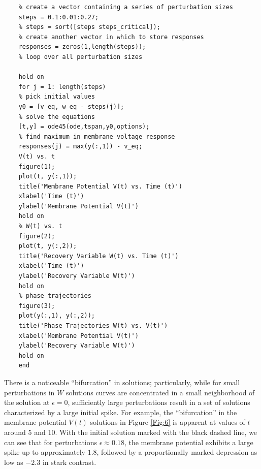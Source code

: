 \documentclass{book}
\theoremstyle{definition}
\begin{document}
\begin{framed}
	\begin{verbatim}
	% create a vector containing a series of perturbation sizes
	steps = 0.1:0.01:0.27;
	% steps = sort([steps steps_critical]);
	% create another vector in which to store responses
	responses = zeros(1,length(steps));
	% loop over all perturbation sizes
	
	hold on
	for j = 1: length(steps)
	% pick initial values
	y0 = [v_eq, w_eq - steps(j)];
	% solve the equations
	[t,y] = ode45(ode,tspan,y0,options);
	% find maximum in membrane voltage response
	responses(j) = max(y(:,1)) - v_eq;
	V(t) vs. t
	figure(1);
	plot(t, y(:,1));
	title('Membrane Potential V(t) vs. Time (t)')
	xlabel('Time (t)') 
	ylabel('Membrane Potential V(t)') 
	hold on
	% W(t) vs. t
	figure(2);
	plot(t, y(:,2));
	title('Recovery Variable W(t) vs. Time (t)')
	xlabel('Time (t)') 
	ylabel('Recovery Variable W(t)') 
	hold on
	% phase trajectories
	figure(3);
	plot(y(:,1), y(:,2));
	title('Phase Trajectories W(t) vs. V(t)')
	xlabel('Membrane Potential V(t)') 
	ylabel('Recovery Variable W(t)') 
	hold on
	end
	\end{verbatim}
\end{framed}



There is a noticeable ``bifurcation'' in solutions; particularly, while for small perturbations in $W$ solutions curves are concentrated in a small neighborhood of the solution at $\epsilon=0$, sufficiently large perturbations result in a set of solutions characterized by a large initial spike. For example, the ``bifurcation'' in the membrane potential $V(t)$ solutions in Figure \ref{Fig:6} is apparent at values of $t$ around $5$ and $10$. With the initial solution marked with the black dashed line, we can see that for perturbations $\epsilon \approx 0.18$, the membrane potential exhibits a large spike up to approximately $1.8$, followed by a proportionally marked depression as low as $-2.3$ in stark contrast. 
\end{document}

